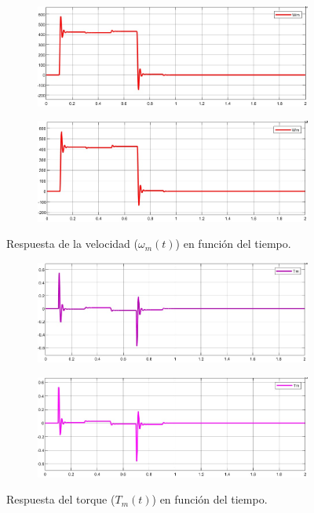 \documentclass{article}
\begin{document}
\begin{figure}[H]
    \centering
    \begin{subfigure}[b]{0.8\textwidth}
        \includegraphics[width=\textwidth]{5.1.6_omega.jpg}
    \end{subfigure}
    \begin{subfigure}[b]{0.8\textwidth}
        \includegraphics[width=1\textwidth]{5.1.6_omega_NL.jpg}
    \end{subfigure}
    \caption{Respuesta de la velocidad ($\omega_m(t)$) en función del tiempo.}
    \label{fig:velocidad}
\end{figure}

\begin{figure}[H]
    \centering
    \begin{subfigure}[b]{0.8\textwidth}
        \includegraphics[width=\textwidth]{5.1.6_torque.jpg}
    \end{subfigure}
    \begin{subfigure}[b]{0.8\textwidth}
        \includegraphics[width=1\textwidth]{5.1.6_torque_NL.jpg}
    \end{subfigure}
    \caption{Respuesta del torque ($T_m(t)$) en función del tiempo.}
    \label{fig:torque_electromagentico}
\end{figure}
\end{document}
